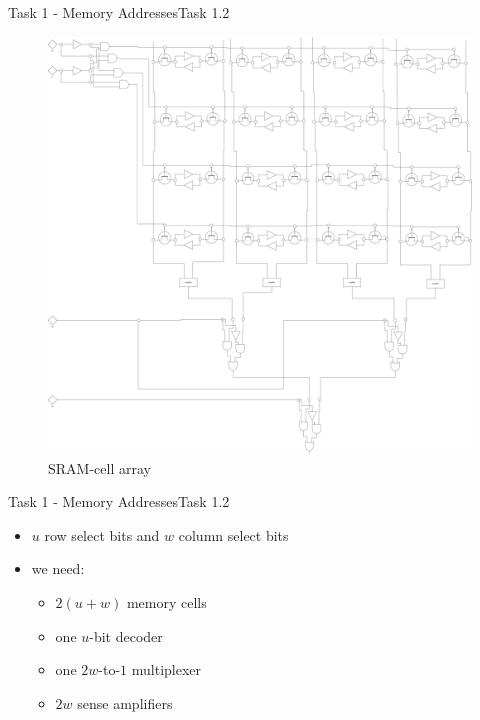 \begin{frame}{Task 1 - Memory Addresses}{Task 1.2\vspace{0.25cm}}
  \begin{figure}
    \centering
    \includegraphics[height=0.6\paperheight]{./figures/sram.png}
    \caption{SRAM-cell array}
  \end{figure}
\end{frame}

\begin{frame}{Task 1 - Memory Addresses}{Task 1.2\vspace{0.25cm}}
  \begin{itemize}
    \item $u$ \alert{row} select bits and $w$ \alert{column} select bits
    \item \alert{we need:}
    \begin{itemize}
      \item $2(u+w)$ memory cells
      \item one $u$-bit decoder
      \item one $2w$-to-$1$ multiplexer
      \item $2w$ sense amplifiers
    \end{itemize}
  \end{itemize}
\end{frame}

